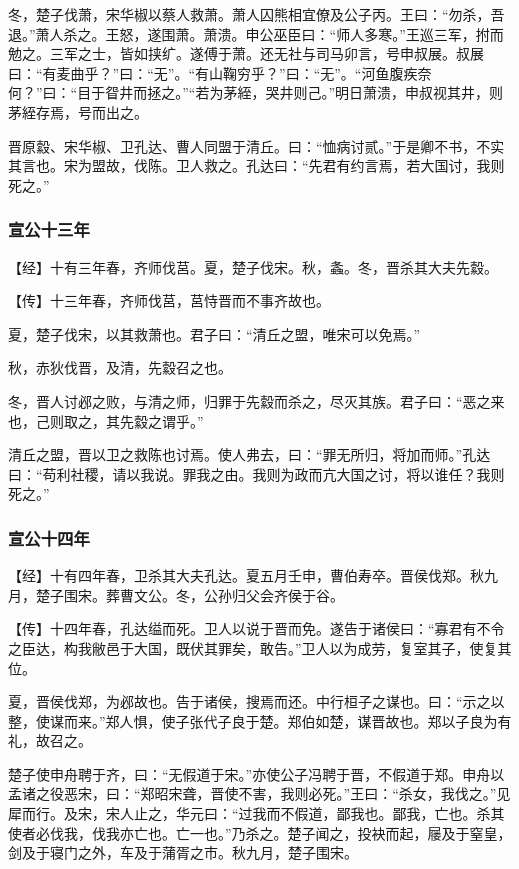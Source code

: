 \documentclass[]{article}
\begin{document}
冬，楚子伐萧，宋华椒以蔡人救萧。萧人囚熊相宜僚及公子丙。王曰：``勿杀，吾退。''萧人杀之。王怒，遂围萧。萧溃。申公巫臣曰：``师人多寒。''王巡三军，拊而勉之。三军之士，皆如挟纩。遂傅于萧。还无社与司马卯言，号申叔展。叔展曰：``有麦曲乎？''曰：``无''。``有山鞠穷乎？''曰：``无''。``河鱼腹疾奈何？''曰：``目于眢井而拯之。''``若为茅絰，哭井则己。''明日萧溃，申叔视其井，则茅絰存焉，号而出之。

晋原縠、宋华椒、卫孔达、曹人同盟于清丘。曰：``恤病讨贰。''于是卿不书，不实其言也。宋为盟故，伐陈。卫人救之。孔达曰：``先君有约言焉，若大国讨，我则死之。''

\hypertarget{header-n1448}{%
\subsubsection{宣公十三年}\label{header-n1448}}

【经】十有三年春，齐师伐莒。夏，楚子伐宋。秋，螽。冬，晋杀其大夫先縠。

【传】十三年春，齐师伐莒，莒恃晋而不事齐故也。

夏，楚子伐宋，以其救萧也。君子曰：``清丘之盟，唯宋可以免焉。''

秋，赤狄伐晋，及清，先縠召之也。

冬，晋人讨邲之败，与清之师，归罪于先縠而杀之，尽灭其族。君子曰：``恶之来也，己则取之，其先縠之谓乎。''

清丘之盟，晋以卫之救陈也讨焉。使人弗去，曰：``罪无所归，将加而师。''孔达曰：``苟利社稷，请以我说。罪我之由。我则为政而亢大国之讨，将以谁任？我则死之。''

\hypertarget{header-n1457}{%
\subsubsection{宣公十四年}\label{header-n1457}}

【经】十有四年春，卫杀其大夫孔达。夏五月壬申，曹伯寿卒。晋侯伐郑。秋九月，楚子围宋。葬曹文公。冬，公孙归父会齐侯于谷。

【传】十四年春，孔达缢而死。卫人以说于晋而免。遂告于诸侯曰：``寡君有不令之臣达，构我敝邑于大国，既伏其罪矣，敢告。''卫人以为成劳，复室其子，使复其位。

夏，晋侯伐郑，为邲故也。告于诸侯，搜焉而还。中行桓子之谋也。曰：``示之以整，使谋而来。''郑人惧，使子张代子良于楚。郑伯如楚，谋晋故也。郑以子良为有礼，故召之。

楚子使申舟聘于齐，曰：``无假道于宋。''亦使公子冯聘于晋，不假道于郑。申舟以孟诸之役恶宋，曰：``郑昭宋聋，晋使不害，我则必死。''王曰：``杀女，我伐之。''见犀而行。及宋，宋人止之，华元曰：``过我而不假道，鄙我也。鄙我，亡也。杀其使者必伐我，伐我亦亡也。亡一也。''乃杀之。楚子闻之，投袂而起，屦及于窒皇，剑及于寝门之外，车及于蒲胥之市。秋九月，楚子围宋。
\end{document}

